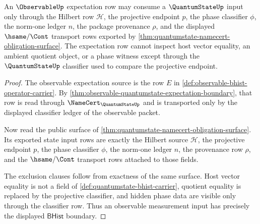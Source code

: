 \begin{theorem}
\label{thm:quantumstate-observable-measurement-input-boundary}
An $\ObservableUp$ expectation row may consume a $\QuantumStateUp$ input only
through the Hilbert row $\mathcal{H}$, the projective endpoint $p$, the
phase classifier $\phi$, the norm-one ledger $n$, the package provenance
$\rho$, and the displayed $\hsame/\Cont$ transport rows exported by
\autoref{thm:quantumstate-namecert-obligation-surface}. The expectation row
cannot inspect host vector equality, an ambient quotient object, or a phase
witness except through the $\QuantumStateUp$ classifier used to compare the
projective endpoint.
\end{theorem}
\begin{proof}
The observable expectation source is the row $E$ in
\autoref{def:observable-bhist-operator-carrier}. By
\autoref{thm:observable-quantumstate-expectation-boundary}, that row is read
through $\NameCert_{\QuantumStateUp}$ and is transported only by the displayed
classifier ledger of the observable packet.

Now read the public surface of
\autoref{thm:quantumstate-namecert-obligation-surface}. Its exported state
input rows are exactly the Hilbert source $\mathcal{H}$, the projective
endpoint $p$, the phase classifier $\phi$, the norm-one ledger $n$, the
provenance row $\rho$, and the $\hsame/\Cont$ transport rows attached to
those fields.

The exclusion clauses follow from exactness of the same surface. Host vector
equality is not a field of \autoref{def:quantumstate-bhist-carrier}, quotient
equality is replaced by the projective classifier, and hidden phase data are
visible only through the classifier row. Thus an observable measurement input
has precisely the displayed $\mathsf{BHist}$ boundary.
\end{proof}

